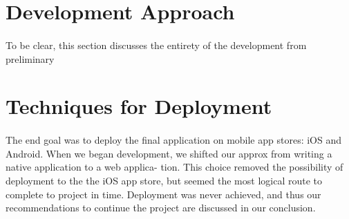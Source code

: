 


\section{Development Approach}

\paragraph{}
To be clear, this section discusses the entirety of the development from preliminary


\section{Techniques for Deployment}

\paragraph{}
The end goal was to deploy the final application on mobile app stores: iOS and Android. When we began development, we shifted our approx from writing a native application to a web applica- tion. This choice removed the possibility of deployment to the the iOS app store, but seemed the most logical route to complete to project in time. Deployment was never achieved, and thus our recommendations to continue the project are discussed in our conclusion.